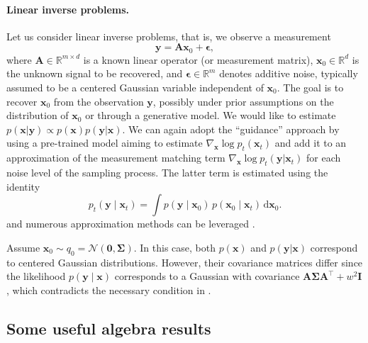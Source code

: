 \documentclass[10pt]{article} %
\newcommand{\engquote}[1]{``#1''}
\def\rvx{{\mathbf{x}}}
\def\rvy{{\mathbf{y}}}
\def\vzero{{\bm{0}}}
\def\vepsilon{{\bm{\epsilon}}}
\def\mA{{\bm{A}}}
\def\mI{{\bm{I}}}
\def\mSigma{{\bm{\Sigma}}}
\begin{document}
\paragraph{Linear inverse problems.} Let us consider linear inverse problems, that is, we observe a measurement \begin{equation}\rvy = \mA \rvx_0 + \vepsilon,\end{equation} where $\mA \in \mathbb{R}^{m \times d}$ is a known linear operator (or measurement matrix), $\rvx_0 \in \mathbb{R}^d$ is the unknown signal to be recovered, and $\vepsilon \in \mathbb{R}^m$ denotes additive noise, typically assumed to be a centered Gaussian variable independent of $\rvx_0$. The goal is to recover $\rvx_0$ from the observation $\rvy$, possibly under prior assumptions on the distribution of $\rvx_0$ or through a generative model. We would like to estimate $p(\rvx | \rvy) \propto p(\rvx)p(\rvy|\rvx)$. We can again adopt the \engquote{guidance} approach by using a pre-trained model aiming to estimate $\nabla_\rvx \log p_t(\rvx_t)$ and add it to an approximation of the measurement matching term $\nabla_\rvx \log p_t(\rvy | \rvx_t)$ for each noise level of the sampling process. The latter term is estimated using the identity \begin{equation}
p_t(\rvy \mid \rvx_t) = \int p(\rvy \mid \rvx_0)\, p(\rvx_0 \mid \rvx_t) \, \mathrm{d}\rvx_0.
\end{equation}
and numerous approximation methods can be leveraged \citep{chung2022diffusion,song2023pseudoinverse}.

Assume $\rvx_0 \sim q_0 = \mathcal{N}(\vzero,\mSigma)$. In this case, both $p(\rvx)$ and $p(\rvy|\rvx)$ correspond to centered Gaussian distributions. However, their covariance matrices differ since the likelihood $p(\rvy \mid \rvx)$ corresponds to a Gaussian with covariance $\mA \mSigma \mA^\top + w^2 \mI$, which contradicts the necessary condition in .
 

\subsection{Some useful algebra results}
\end{document}

